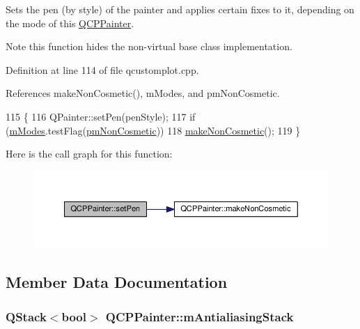Sets the pen (by style) of the painter and applies certain fixes to it, depending on the mode of this \hyperlink{class_q_c_p_painter}{Q\+C\+P\+Painter}.

\begin{DoxyNote}{Note}
this function hides the non-\/virtual base class implementation. 
\end{DoxyNote}


Definition at line 114 of file qcustomplot.\+cpp.



References make\+Non\+Cosmetic(), m\+Modes, and pm\+Non\+Cosmetic.


\begin{DoxyCode}
115 \{
116   QPainter::setPen(penStyle);
117   \textcolor{keywordflow}{if} (\hyperlink{class_q_c_p_painter_af5d1d6e5df0adbc7de5633250fb3396c}{mModes}.testFlag(\hyperlink{class_q_c_p_painter_a156cf16444ff5e0d81a73c615fdb156dac1e481bfaf408f2bd2eaad3ec341f36b}{pmNonCosmetic}))
118     \hyperlink{class_q_c_p_painter_a7e63fbcf47e35c6f2ecd11b8fef7c7d8}{makeNonCosmetic}();
119 \}
\end{DoxyCode}


Here is the call graph for this function\+:\nopagebreak
\begin{figure}[H]
\begin{center}
\leavevmode
\includegraphics[width=350pt]{class_q_c_p_painter_a25e76095aae41da0d08035060e5f81ca_cgraph}
\end{center}
\end{figure}




\subsection{Member Data Documentation}
\hypertarget{class_q_c_p_painter_a0189e641bbf7dc31ac15aef7b36501fa}{}
\subsubsection[{m\+Antialiasing\+Stack}]{\setlength{\rightskip}{0pt plus 5cm}Q\+Stack$<$bool$>$ Q\+C\+P\+Painter\+::m\+Antialiasing\+Stack\hspace{0.3cm}{\ttfamily [protected]}}\label{class_q_c_p_painter_a0189e641bbf7dc31ac15aef7b36501fa}


